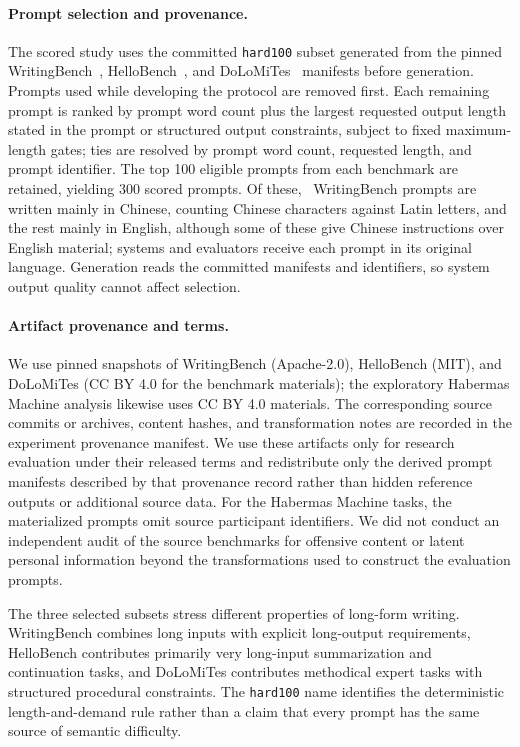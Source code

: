 \paragraph{Prompt selection and provenance.}
The scored study uses the committed \texttt{hard100} subset generated from the pinned WritingBench~\citep{wu2026writingbench}, HelloBench~\citep{que2024hellobench}, and DoLoMiTes~\citep{malaviya2025dolomites} manifests before generation.
Prompts used while developing the protocol are removed first.
Each remaining prompt is ranked by prompt word count plus the largest requested output length stated in the prompt or structured output constraints, subject to fixed maximum-length gates; ties are resolved by prompt word count, requested length, and prompt identifier.
The top 100 eligible prompts from each benchmark are retained, yielding 300 scored prompts.
Of these, \WritingChinesePromptCount\ WritingBench prompts are written mainly in Chinese, counting Chinese characters against Latin letters, and the rest mainly in English, although some of these give Chinese instructions over English material; systems and evaluators receive each prompt in its original language.
Generation reads the committed manifests and identifiers, so system output quality cannot affect selection.

\paragraph{Artifact provenance and terms.}
We use pinned snapshots of WritingBench (Apache-2.0), HelloBench (MIT), and DoLoMiTes (CC BY 4.0 for the benchmark materials); the exploratory Habermas Machine analysis likewise uses CC BY 4.0 materials.
The corresponding source commits or archives, content hashes, and transformation notes are recorded in the experiment provenance manifest.
We use these artifacts only for research evaluation under their released terms and redistribute only the derived prompt manifests described by that provenance record rather than hidden reference outputs or additional source data.
For the Habermas Machine tasks, the materialized prompts omit source participant identifiers.
We did not conduct an independent audit of the source benchmarks for offensive content or latent personal information beyond the transformations used to construct the evaluation prompts.

The three selected subsets stress different properties of long-form writing.
WritingBench combines long inputs with explicit long-output requirements, HelloBench contributes primarily very long-input summarization and continuation tasks, and DoLoMiTes contributes methodical expert tasks with structured procedural constraints.
The \texttt{hard100} name identifies the deterministic length-and-demand rule rather than a claim that every prompt has the same source of semantic difficulty.

